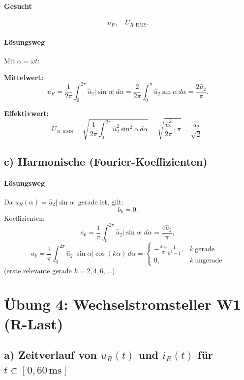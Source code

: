 \paragraph{Gesucht}
\[
\overline{u_R},\quad U_{R,\mathrm{RMS}}.
\]

\paragraph{Lösungsweg}
Mit $\alpha=\omega t$:

\textbf{Mittelwert:}
\[
\overline{u_R}
=\frac{1}{2\pi}\int_0^{2\pi}\hat u_2|\sin\alpha|\,d\alpha
=\frac{2}{2\pi}\int_0^{\pi}\hat u_2\sin\alpha\,d\alpha
=\boxed{\frac{2\hat u_2}{\pi}}.
\]

\textbf{Effektivwert:}
\[
U_{R,\mathrm{RMS}}
=\sqrt{\frac{1}{2\pi}\int_0^{2\pi}\hat u_2^2\sin^2\alpha\,d\alpha}
=
\sqrt{\frac{\hat u_2^2}{2\pi}\cdot\pi}
=
\boxed{\frac{\hat u_2}{\sqrt{2}}}.
\]

\subsection*{c) Harmonische (Fourier-Koeffizienten)}

\paragraph{Lösungsweg}
Da $u_R(\alpha)=\hat u_2|\sin\alpha|$ gerade ist, gilt:
\[
b_k=0.
\]
Koeffizienten:
\[
a_0=\frac{1}{\pi}\int_0^{2\pi}\hat u_2|\sin\alpha|\,d\alpha=\boxed{\frac{4\hat u_2}{\pi}},
\]
\[
a_k=\frac{1}{\pi}\int_0^{2\pi}\hat u_2|\sin\alpha|\cos(k\alpha)\,d\alpha
=
\begin{cases}
-\frac{4\hat u_2}{\pi}\frac{1}{k^2-1}, & k\ \text{gerade}\\
0, & k\ \text{ungerade}
\end{cases}
\]
(erste relevante gerade $k=2,4,6,\dots$).



\section{Übung 4: Wechselstromsteller W1 (R-Last)}

\subsection*{a) Zeitverlauf von $u_R(t)$ und $i_R(t)$ für $t\in[0,60\,\mathrm{ms}]$}

